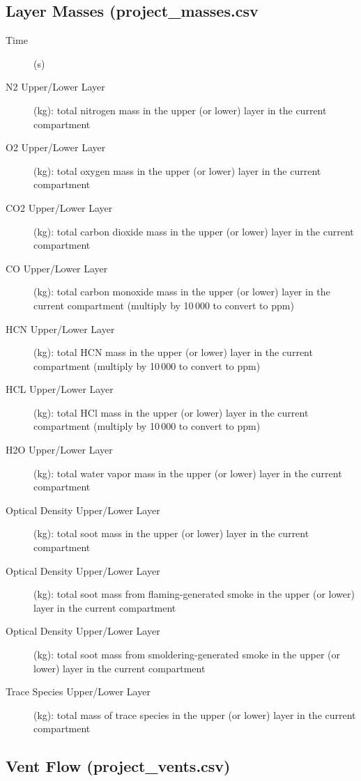 \subsection{Layer Masses (project\_masses.csv}

\begin{description}
\item[Time] (s)
\item[N2 Upper/Lower Layer] (kg): total nitrogen mass in the upper (or lower) layer in the current compartment
\item[O2 Upper/Lower Layer] (kg): total oxygen mass in the upper (or lower) layer in the current compartment
\item[CO2 Upper/Lower Layer] (kg):  total carbon dioxide mass in the upper (or lower) layer in the current compartment
\item[CO Upper/Lower Layer] (kg):  total carbon monoxide mass in the upper (or lower) layer in the current compartment (multiply by 10\,000 to convert to ppm)
\item[HCN Upper/Lower Layer] (kg):  total HCN mass in the upper (or lower) layer in the current compartment (multiply by 10\,000 to convert to ppm)
\item[HCL Upper/Lower Layer] (kg):  total HCl mass in the upper (or lower) layer in the current compartment (multiply by 10\,000 to convert to ppm)
\item[H2O Upper/Lower Layer] (kg):  total water vapor mass in the upper (or lower) layer in the current compartment
\item[Optical Density Upper/Lower Layer] (kg):  total soot mass in the upper (or lower) layer in the current compartment
\item[Optical Density Upper/Lower Layer] (kg):  total soot mass from flaming-generated smoke in the upper (or lower) layer in the current compartment
\item[Optical Density Upper/Lower Layer] (kg):  total soot mass from smoldering-generated smoke in the upper (or lower) layer in the current compartment
\item[Trace Species Upper/Lower Layer] (kg):  total mass of trace species in the upper (or lower) layer in the current compartment
\end{description}

\subsection{Vent Flow (project\_vents.csv)}

